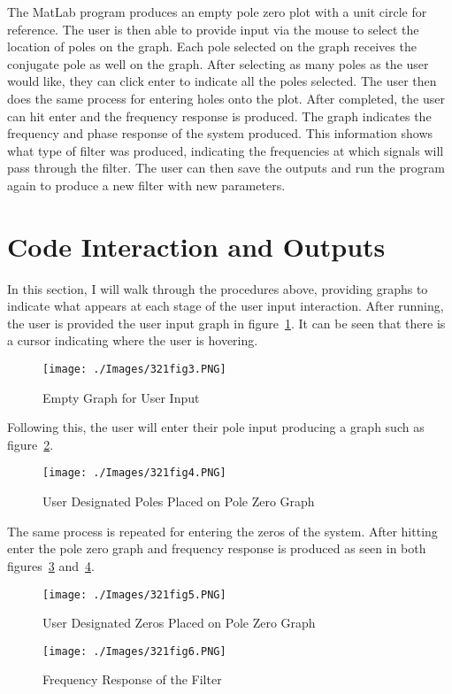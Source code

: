 \documentclass[a4paper]{article}
\begin{document}
The MatLab program produces an empty pole zero plot with a unit circle for reference. The user is then able to provide input via the mouse to select the location of poles on the graph. Each pole selected on the graph receives the conjugate pole as well on the graph. After selecting as many poles as the user would like, they can click enter to indicate all the poles selected. The user then does the same process for entering holes onto the plot. After completed, the user can hit enter and the frequency response is produced. The graph indicates the frequency and phase response of the system produced. This information shows what type of filter was produced, indicating the frequencies at which signals will pass through the filter. The user can then save the outputs and run the program again to produce a new filter with new parameters.

\section{Code Interaction and Outputs}
In this section, I will walk through the procedures above, providing graphs to indicate what appears at each stage of the user input interaction. After running, the user is provided the user input graph in figure~\ref{fig:3}. It can be seen that there is a cursor indicating where the user is hovering. 
  \begin{figure}[h]
    \centering
    \texttt{[image: ./Images/321fig3.PNG]}
    \caption{Empty Graph for User Input}
    \label{fig:3}
  \end{figure}

Following this, the user will enter their pole input producing a graph such as figure~\ref{fig:4}. 
  \begin{figure}[h]
    \centering
    \texttt{[image: ./Images/321fig4.PNG]}
    \caption{User Designated Poles Placed on Pole Zero Graph}
    \label{fig:4}
  \end{figure}

The same process is repeated for entering the zeros of the system. After hitting enter the pole zero graph and frequency response is produced as seen in both figures~\ref{fig:5} and~\ref{fig:6}. 
  \begin{figure}[h]
    \centering
    \texttt{[image: ./Images/321fig5.PNG]}
    \caption{User Designated Zeros Placed on Pole Zero Graph}
    \label{fig:5}
  \end{figure}

  \begin{figure}[h]
    \centering
    \texttt{[image: ./Images/321fig6.PNG]}
    \caption{Frequency Response of the Filter}
    \label{fig:6}
  \end{figure}
  
\end{document}
